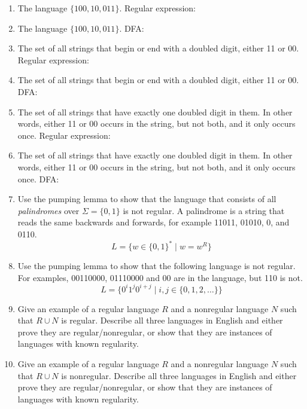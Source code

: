 \documentclass{article}
\begin{document}
\begin{enumerate}
\item
  \label{langfirst}
  The language $\{100, 10, 011\}$.
  Regular expression: 

\item   The language $\{100, 10, 011\}$.
  DFA:
    

\item The set of 
  all strings that begin or end with a doubled digit, either 11 or 00.
  Regular expression:

  
\item The set of 
  all strings that begin or end with a doubled digit, either 11 or 00.
  DFA:

  
\item
The set of all strings that have exactly one doubled digit in them.
  In other words, either 11 or 00 occurs in the string, but not both,
  and it only occurs once.
  Regular expression:
  

\item \label{langlast}
The set of all strings that have exactly one doubled digit in them.
  In other words, either 11 or 00 occurs in the string, but not both,
  and it only occurs once.
DFA:

\item Use the pumping lemma to show that the language that consists of
  all {\em palindromes} over $\Sigma=\{0,1\}$ is not regular.  A palindrome
  is a string that reads the same backwards and forwards, for example
  11011, 01010, 0, and 0110.
  \[ L = \{w \in \{0,1\}^* \mid w = w^R\}\]

\item Use the pumping lemma to show that the following language is not
  regular.  For examples, 00110000, 01110000 and 00 are in the
  language, but 110 is not.
  \[ L = \{0^i1^j0^{i+j} \mid i,j\in\{0,1,2,\ldots\}\} \]
    


\item Give an example of a regular language $R$ and a nonregular
  language $N$ such that $R\cup N$ is regular.  Describe all three
  languages in English and either prove they are regular/nonregular,
  or show that they are instances of languages with known regularity.



\item Give an example of a regular language $R$ and a nonregular
  language $N$ such that $R\cup N$ is nonregular. Describe all three
  languages in English and either prove they are regular/nonregular,
  or show that they are instances of languages with known regularity.



\end{enumerate}
\end{document}
